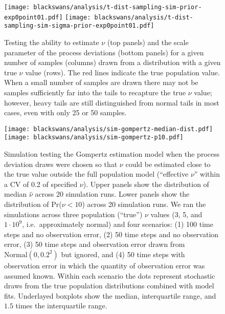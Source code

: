 \begin{figure}[htbp]
\begin{center}
\texttt{[image: blackswans/analysis/t-dist-sampling-sim-prior-exp0point01.pdf]}
\texttt{[image: blackswans/analysis/t-dist-sampling-sim-sigma-prior-exp0point01.pdf]}

\caption[Testing the ability to estimate $\nu$  and the scale parameter of the
process deviations for a given number of samples drawn from a distribution
with a given true $\nu$ value.]{Testing the ability to estimate $\nu$ (top
  panels) and the scale parameter of the process deviations (bottom panels)
  for a given number of samples (columns) drawn from a distribution with a
  given true $\nu$ value (rows). The red lines indicate the true population
  value. When a small number of samples are drawn there may not be samples
  sufficiently far into the tails to recapture the true $\nu$ value; however,
  heavy tails are still distinguished from normal tails in most cases, even
  with only 25 or 50 samples.}

\label{fig:sim-nu}
\end{center}
\end{figure}

\clearpage

\begin{figure}[htbp]
\begin{center}
\texttt{[image: blackswans/analysis/sim-gompertz-median-dist.pdf]}
\texttt{[image: blackswans/analysis/sim-gompertz-p10.pdf]}

\caption[Simulation testing the Gompertz estimation model when the process
deviation draws were chosen so that $\nu$ could be estimated close to the true
value outside the full population model (``effective $\nu$'' within a CV of
0.2 of specified $\nu$).]{Simulation testing the Gompertz estimation model
  when the process deviation draws were chosen so that $\nu$ could be
  estimated close to the true value outside the full population model
  (``effective $\nu$'' within a CV of 0.2 of specified $\nu$). Upper panels
  show the distribution of median $\widehat{\nu}$ across 20 simulation runs.
  Lower panels show the distribution of Pr($\nu < 10$) across 20 simulation
  runs. We ran the simulations across three population (``true'') $\nu$ values
  (3, 5, and $1\cdot 10^9$, i.e.\ approximately normal) and four scenarios:
  (1) 100 time steps and no observation error, (2) 50 time steps and no
  observation error, (3) 50 time steps and observation error drawn from
  $\mathrm{Normal} (0,
  0.2^2)$ but ignored, and (4) 50 time steps with observation error in which
    the quantity of observation error was assumed known. Within each scenario
    the dots represent stochastic draws from the true population distributions
    combined with model fits. Underlayed boxplots show the median,
    interquartile range, and $1.5$ times the interquartile range. }

\label{fig:sim-prob}
\end{center}
\end{figure}

